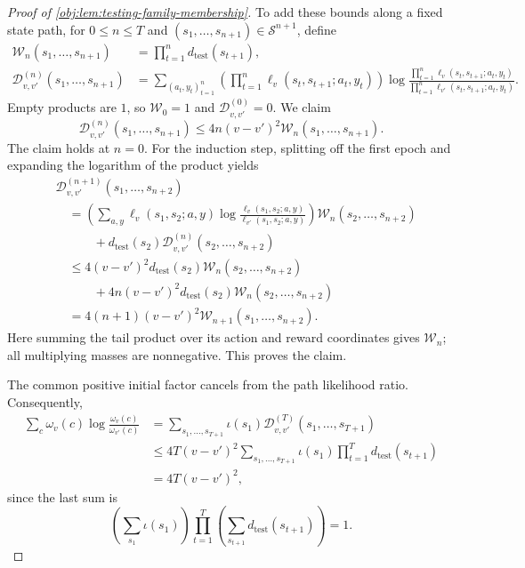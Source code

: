 \documentclass[11pt]{article}
\begin{document}
\begin{proof}[Proof of \cref{obj:lem:testing-family-membership}]
To add these bounds along a fixed state path, for \(0\leq n\leq T\) and
\((s_1,\ldots,s_{n+1})\in\mathcal S^{n+1}\), define
\[
\begin{aligned}
\mathcal W_n(s_1,\ldots,s_{n+1})
&=\prod_{t=1}^n d_{\mathrm{test}}(s_{t+1}),\\
\mathcal D_{v,v'}^{(n)}(s_1,\ldots,s_{n+1})
&=\sum_{(a_t,y_t)_{t=1}^n}
 \left(\prod_{t=1}^n\ell_v(s_t,s_{t+1};a_t,y_t)\right)
 \log
 \frac{\prod_{t=1}^n\ell_v(s_t,s_{t+1};a_t,y_t)}
      {\prod_{t=1}^n\ell_{v'}(s_t,s_{t+1};a_t,y_t)}.
\end{aligned}
\]
Empty products are \(1\), so \(\mathcal W_0=1\) and
\(\mathcal D_{v,v'}^{(0)}=0\). We claim
\[
\mathcal D_{v,v'}^{(n)}(s_1,\ldots,s_{n+1})
\leq4n(v-v')^2\mathcal W_n(s_1,\ldots,s_{n+1}).
\]
The claim holds at \(n=0\). For the induction step, splitting off the first epoch and expanding the logarithm of the product yields
\[
\begin{aligned}
&\mathcal D_{v,v'}^{(n+1)}(s_1,\ldots,s_{n+2})\\
&\quad=
\left(
 \sum_{a,y}\ell_v(s_1,s_2;a,y)
 \log\frac{\ell_v(s_1,s_2;a,y)}{\ell_{v'}(s_1,s_2;a,y)}
\right)\mathcal W_n(s_2,\ldots,s_{n+2})\\
&\qquad\quad+
d_{\mathrm{test}}(s_2)
\mathcal D_{v,v'}^{(n)}(s_2,\ldots,s_{n+2})\\
&\quad\leq
4(v-v')^2d_{\mathrm{test}}(s_2)
 \mathcal W_n(s_2,\ldots,s_{n+2})\\
&\qquad\quad+
4n(v-v')^2d_{\mathrm{test}}(s_2)
 \mathcal W_n(s_2,\ldots,s_{n+2})\\
&\quad=
4(n+1)(v-v')^2\mathcal W_{n+1}(s_1,\ldots,s_{n+2}).
\end{aligned}
\]
Here summing the tail product over its action and reward coordinates gives
\(\mathcal W_n\); all multiplying masses are nonnegative. This proves the claim.

The common positive initial factor cancels from the path likelihood ratio. Consequently,
\[
\begin{aligned}
\sum_c\omega_v(c)\log\frac{\omega_v(c)}{\omega_{v'}(c)}
&=
\sum_{s_1,\ldots,s_{T+1}}
\iota(s_1)\mathcal D_{v,v'}^{(T)}(s_1,\ldots,s_{T+1})\\
&\leq
4T(v-v')^2
\sum_{s_1,\ldots,s_{T+1}}
\iota(s_1)\prod_{t=1}^T d_{\mathrm{test}}(s_{t+1})\\
&=4T(v-v')^2,
\end{aligned}
\]
since the last sum is
\[
\left(\sum_{s_1}\iota(s_1)\right)
\prod_{t=1}^T\left(\sum_{s_{t+1}}d_{\mathrm{test}}(s_{t+1})\right)=1.
\]


\end{proof}
\end{document}

